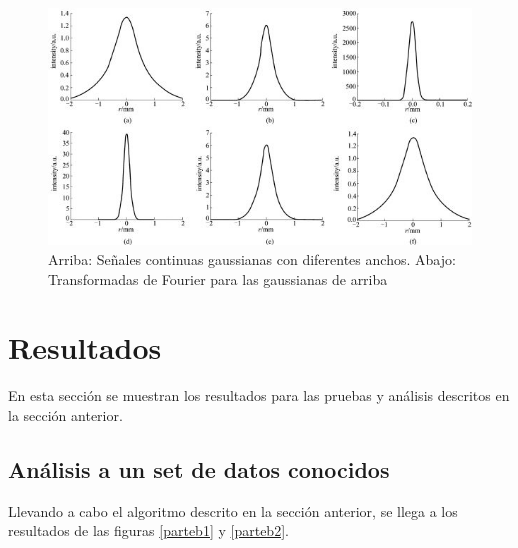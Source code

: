 \documentclass[letterpaper,11pt]{article}
\begin{document}
\begin{figure}[H]
\centering
\includegraphics[width=1.0\textwidth,height = 0.45\textwidth]{img/parte_d/fourier.jpg}
\caption{Arriba: Señales continuas gaussianas con diferentes anchos. Abajo: Transformadas de Fourier para las gaussianas de arriba}
\label{fourier}
\end{figure}

\section{Resultados}

En esta sección se muestran los resultados para las pruebas y análisis descritos en la sección anterior.

\subsection{Análisis a un set de datos conocidos}
Llevando a cabo el algoritmo descrito en la sección anterior, se llega a los resultados de las figuras \ref{parteb1} y \ref{parteb2}.
\end{document}
